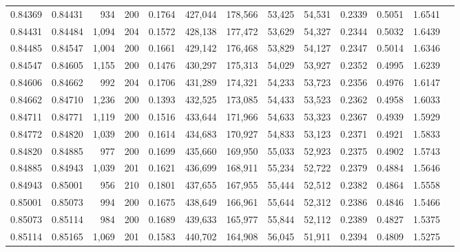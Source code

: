\begin{tabular}{rrrrrrrrrrrrr}
0.84369 & 0.84431 &   934 & 200 &                                     0.1764 & 427,044 & 178,566 &  53,425 &  54,531 & 0.2339 & 0.5051 & 1.6541 \\
0.84431 & 0.84484 & 1,094 & 204 &                                     0.1572 & 428,138 & 177,472 &  53,629 &  54,327 & 0.2344 & 0.5032 & 1.6439 \\
0.84485 & 0.84547 & 1,004 & 200 &                                     0.1661 & 429,142 & 176,468 &  53,829 &  54,127 & 0.2347 & 0.5014 & 1.6346 \\
0.84547 & 0.84605 & 1,155 & 200 &                                     0.1476 & 430,297 & 175,313 &  54,029 &  53,927 & 0.2352 & 0.4995 & 1.6239 \\
0.84606 & 0.84662 &   992 & 204 &                                     0.1706 & 431,289 & 174,321 &  54,233 &  53,723 & 0.2356 & 0.4976 & 1.6147 \\
0.84662 & 0.84710 & 1,236 & 200 &                                     0.1393 & 432,525 & 173,085 &  54,433 &  53,523 & 0.2362 & 0.4958 & 1.6033 \\
0.84711 & 0.84771 & 1,119 & 200 &                                     0.1516 & 433,644 & 171,966 &  54,633 &  53,323 & 0.2367 & 0.4939 & 1.5929 \\
0.84772 & 0.84820 & 1,039 & 200 &                                     0.1614 & 434,683 & 170,927 &  54,833 &  53,123 & 0.2371 & 0.4921 & 1.5833 \\
0.84820 & 0.84885 &   977 & 200 &                                     0.1699 & 435,660 & 169,950 &  55,033 &  52,923 & 0.2375 & 0.4902 & 1.5743 \\
0.84885 & 0.84943 & 1,039 & 201 &                                     0.1621 & 436,699 & 168,911 &  55,234 &  52,722 & 0.2379 & 0.4884 & 1.5646 \\
0.84943 & 0.85001 &   956 & 210 &                                     0.1801 & 437,655 & 167,955 &  55,444 &  52,512 & 0.2382 & 0.4864 & 1.5558 \\
0.85001 & 0.85073 &   994 & 200 &                                     0.1675 & 438,649 & 166,961 &  55,644 &  52,312 & 0.2386 & 0.4846 & 1.5466 \\
0.85073 & 0.85114 &   984 & 200 &                                     0.1689 & 439,633 & 165,977 &  55,844 &  52,112 & 0.2389 & 0.4827 & 1.5375 \\
0.85114 & 0.85165 & 1,069 & 201 &                                     0.1583 & 440,702 & 164,908 &  56,045 &  51,911 & 0.2394 & 0.4809 & 1.5275 \\

\end{tabular}
